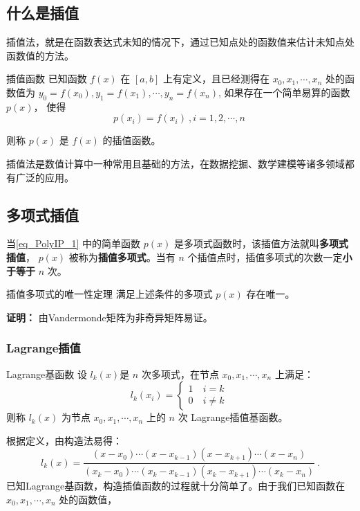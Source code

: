 \subsection{什么是插值}
插值法，就是在函数表达式未知的情况下，通过已知点处的函数值来估计未知点处函数值的方法。\begin{definition}{插值函数}
已知函数 $f(x)$ 在 $\left[a,b\right] $ 上有定义，且已经测得在 $x_0,x_1,\cdots, x_n$ 处的函数值为 $y_0 = f(x_0),y_1 = f(x_1), \cdots, y_n = f(x_n)$, 如果存在一个简单易算的函数 $p(x)$， 使得\begin{equation}
\label{eq_PolyIP_1}
p(x_i) = f(x_i)~, i = 1,2, \cdots, n~
\end{equation}

则称 $p(x)$ 是 $f(x)$ 的插值函数。
\end{definition}

插值法是数值计算中一种常用且基础的方法，在数据挖掘、数学建模等诸多领域都有广泛的应用。

\subsection{多项式插值}
当\autoref{eq_PolyIP_1} 中的简单函数 $p(x)$ 是多项式函数时，该插值方法就叫\textbf{多项式插值}， $p(x)$ 被称为\textbf{插值多项式}。当有 $n$ 个插值点时，插值多项式的次数一定\textbf{小于等于} $n$ 次。
\begin{theorem}{插值多项式的唯一性定理}
满足上述条件的多项式 $p(x)$ 存在唯一。

\end{theorem}
\textbf{证明：} 由Vandermonde矩阵为非奇异矩阵易证。
\subsubsection{Lagrange插值}
\begin{definition}{Lagrange基函数}
设 $l_k(x)$是 $n$ 次多项式，在节点 $x_0, x_1,\cdots,x_n$ 上满足：
\begin{equation}
l_k(x_i) = 
\begin{cases}
1\ &i = k\\
0 \ &i \neq k
\end{cases}~
\end{equation}
则称 $l_k(x)$ 为节点 $x_0,x_1,\cdots,x_n$ 上的 $n$ 次 Lagrange插值基函数。
\end{definition}
根据定义，由构造法易得：
\begin{equation}
l_k(x) = \frac{(x-x_0)\cdots(x-x_{k-1})(x-x_{k+1})\cdots (x-x_n)}{(x_k-x_0)\cdots(x_k-x_{k-1})(x_k-x_{k+1})\cdots(x_k-x_n)}~.
\end{equation}
已知Lagrange基函数，构造插值函数的过程就十分简单了。由于我们已知函数在 $x_0,x_1,\cdots,x_n$ 处的函数值，

